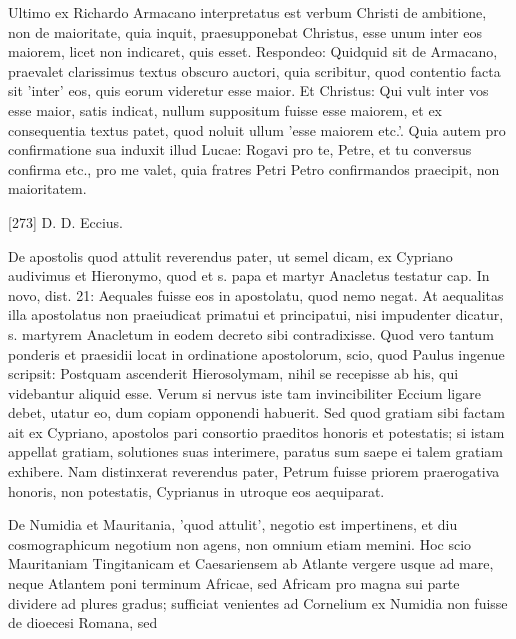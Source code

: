 Ultimo ex Richardo Armacano interpretatus est verbum Christi de ambitione, non de maioritate, quia inquit, praesupponebat Christus, esse unum inter eos maiorem, licet non indicaret, quis esset. Respondeo: Quidquid sit de Armacano, praevalet clarissimus textus obscuro auctori, quia scribitur, quod contentio facta sit 'inter' eos, quis eorum videretur esse maior. Et Christus: Qui vult inter vos esse maior, satis indicat, nullum suppositum fuisse esse maiorem, et ex consequentia textus patet, quod noluit ullum 'esse maiorem etc.'. Quia autem pro confirmatione sua induxit illud Lucae: Rogavi pro te, Petre, et tu conversus confirma etc., pro me valet, quia fratres Petri Petro confirmandos praecipit, non maioritatem.

[273] D. D. Eccius.

De apostolis quod attulit reverendus pater, ut semel dicam, ex Cypriano audivimus et Hieronymo, quod et s. papa et martyr Anacletus testatur cap. In novo, dist. 21: Aequales fuisse eos in apostolatu, quod nemo negat. At aequalitas illa apostolatus non praeiudicat primatui et principatui, nisi impudenter dicatur, s. martyrem Anacletum in eodem decreto sibi contradixisse. Quod vero tantum ponderis et praesidii locat in ordinatione apostolorum, scio, quod Paulus ingenue scripsit: Postquam ascenderit Hierosolymam, nihil se recepisse ab his, qui videbantur aliquid esse. Verum si nervus iste tam invincibiliter Eccium ligare debet, utatur eo, dum copiam opponendi habuerit. Sed quod gratiam sibi factam ait ex Cypriano, apostolos pari consortio praeditos honoris et potestatis; si istam appellat gratiam, solutiones suas interimere, paratus sum saepe ei talem gratiam exhibere. Nam distinxerat reverendus pater, Petrum fuisse priorem praerogativa honoris, non potestatis, Cyprianus in utroque eos aequiparat.

De Numidia et Mauritania, 'quod attulit', negotio est impertinens, et diu cosmographicum negotium non agens, non omnium etiam memini. Hoc scio Mauritaniam Tingitanicam et Caesariensem ab Atlante vergere usque ad mare, neque Atlantem poni terminum Africae, sed Africam pro magna sui parte dividere ad plures gradus; sufficiat venientes ad Cornelium ex Numidia non fuisse de dioecesi Romana, sed

